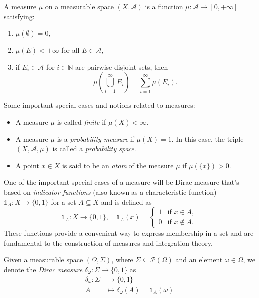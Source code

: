 \begin{definition}[Measure]
    A measure $\mu$ on a measurable space $(X, \mathcal{A})$ is a function $\mu: \mathcal{A} \to [0, +\infty]$ satisfying:
    \begin{enumerate}[label=(\roman*)]
        \item $\mu(\emptyset) = 0$,
        \item $\mu(E) < +\infty$ for all $E \in \mathcal{A}$,
        \item if $E_i \in \mathcal{A}$ for $i \in \mathbb{N}$ are pairwise disjoint sets, then
        \[
            \mu\left(\bigcup_{i=1}^\infty E_i\right) = \sum_{i=1}^\infty \mu(E_i).
        \]
    \end{enumerate}
\end{definition}

\begin{notenl}
    Some important special cases and notions related to measures:
    \begin{itemize}
        \item A measure $\mu$ is called \emph{finite} if $\mu(X) < \infty$.
        \item A measure $\mu$ is a \emph{probability measure} if $\mu(X) = 1$. In this case, the triple $(X, \mathcal{A}, \mu)$ is called a \emph{probability space}.
        \item A point $x \in X$ is said to be an \emph{atom} of the measure $\mu$ if $\mu(\{x\}) > 0$.
    \end{itemize}
\end{notenl}

One of the important special cases of a measure will be Dirac measure that's based on \emph{indicator functions} (also known as a characteristic function) $\mathds{1}_A: X \to \{0, 1\}$ for a set $A \subseteq X$ and is defined as
\begin{equation}
    \label{eq:indicator-function-def}
    \mathds{1}_A: X \to \{0, 1\}, \quad \mathds{1}_A(x) =
    \begin{cases}
        1 & \text{if } x \in A, \\
        0 & \text{if } x \notin A.
    \end{cases}
\end{equation}
These functions provide a convenient way to express membership in a set and are fundamental to the construction of measures and integration theory.


\begin{definition}
    Given a measurable space $(\Omega, \Sigma)$, where $\Sigma \subseteq \mathcal{P}(\Omega)$ and an element $\omega \in \Omega$, we denote the \emph{Dirac measure} $\delta_{\omega}: \Sigma \to \{0, 1\}$ as
    \[
        \begin{aligned}
            \delta_{\omega}: \Sigma &\to \{0, 1\} \\
            A &\mapsto \delta_{\omega}(A) = \mathds{1}_A(\omega)
        \end{aligned}
    \]
\end{definition}

